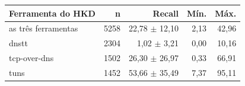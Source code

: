\begin{tabular}{lrrrr}
\hline
\textbf{Ferramenta do HKD} & \textbf{n} & \textbf{Recall} & \textbf{Mín.} & \textbf{Máx.} \\ \hline
as três ferramentas & 5258 & 22,78 $\pm$ 12,10 & 2,13 & 42,96 \\
dnstt & 2304 & 1,02 $\pm$ 3,21 & 0,00 & 10,16 \\
tcp-over-dns & 1502 & 26,30 $\pm$ 26,97 & 0,33 & 66,91 \\
tuns & 1452 & 53,66 $\pm$ 35,49 & 7,37 & 95,11 \\
\hline
\end{tabular}
